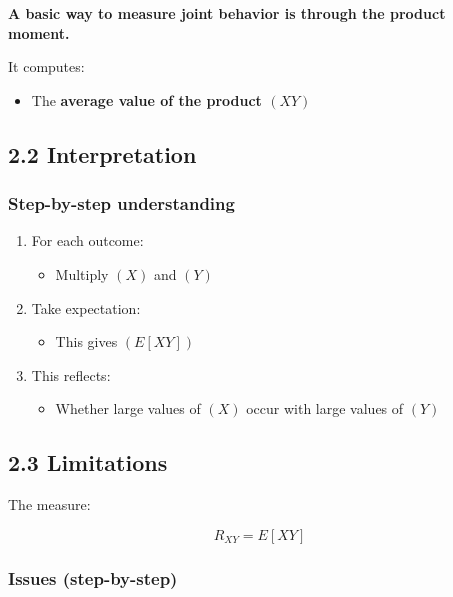 \documentclass[12pt]{article}
\begin{document}
\textbf{A basic way to measure joint behavior is through the product moment.}

It computes:
\begin{itemize}
\item The \textbf{average value of the product $(XY)$}
\end{itemize}

\subsection*{2.2 Interpretation}

\subsubsection*{Step-by-step understanding}

\begin{enumerate}
\item For each outcome:
\begin{itemize}
\item Multiply $(X)$ and $(Y)$
\end{itemize}
\item Take expectation:
\begin{itemize}
\item This gives $(E[XY])$
\end{itemize}
\item This reflects:
\begin{itemize}
\item Whether large values of $(X)$ occur with large values of $(Y)$
\end{itemize}
\end{enumerate}

\subsection*{2.3 Limitations}

The measure:

\[
R_{XY} = E[XY]
\]

\subsubsection*{Issues (step-by-step)}
\end{document}
